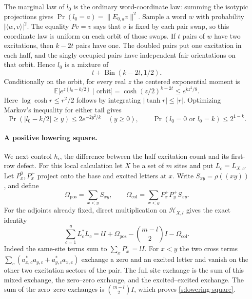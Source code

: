 The marginal law of \(l_0\) is the ordinary word-coordinate law:
summing the isotypic projections gives
\(\Pr(l_0=a)=\|E_{0,a}v\|^2\).  Sample a word \(w\) with probability
\(|\langle w,v\rangle|^2\).  The equality \(Pv=v\) says that \(v\) is
fixed by each pair swap, so this coordinate law is uniform on each
orbit of those swaps.  If \(t\) pairs of \(w\) have two excitations,
then \(k-2t\) pairs have one.  The doubled pairs put one excitation in
each half, and the singly occupied pairs have independent fair
orientations on that orbit.  Hence \(l_0\) is a mixture of
\[
 t+\operatorname{Bin}(k-2t,1/2).
\]
Conditionally on the orbit, for every real $z$ the centered exponential
moment is
\[
 \mathbb E\bigl[e^{z(l_0-k/2)}\mid\text{orbit}\bigr]
 =\cosh(z/2)^{k-2t}\le e^{kz^2/8}.
\]
Here $\log\cosh r\le r^2/2$ follows by integrating
$|\tanh r|\le|r|$.  Optimizing Markov's inequality for either tail gives
\begin{equation}\label{s:lowering-split-law}
 \Pr(|l_0-k/2|\ge y)\le2e^{-2y^2/k}\quad(y\ge0),
 \qquad
 \Pr(l_0=0\text{ or }l_0=k)\le2^{1-k}.
\end{equation}

\paragraph{A positive lowering square.}
We next control \(h_i\), the difference between the half excitation
count and its first-row defect.  For this local calculation let \(X\)
be a set of \(m\) sites and put \(L_c=L_{X,c}\).  Let \(P_x^0,P_x^+\) project onto the base and excited letters at \(x\).
Write \(S_{xy}=\rho((xy))\), and define
\[
 \Omega_{\mathrm{pos}}=\sum_{x<y}S_{xy},
 \qquad
 \Omega_{\mathrm{col}}=\sum_{x<y}P_x^+P_y^+S_{xy}.
\]
For the adjoints already fixed, direct multiplication on
\(\mathcal H_{X,l}\) gives the exact identity
\begin{equation}\label{s:lowering-square}
 \sum_{c=1}^q L_c^*L_c
 =lI+\Omega_{\mathrm{pos}}
       -\binom{m-l}{2}I-\Omega_{\mathrm{col}}.
\end{equation}
Indeed the same-site terms sum to \(\sum_xP_x^+=lI\).
For \(x<y\) the two cross terms
\(\sum_c(a_{x,c}^*a_{y,c}+a_{y,c}^*a_{x,c})\) exchange a zero and
an excited letter and vanish on the other two excitation sectors of
the pair.  The full site exchange is the sum of this mixed exchange,
the zero--zero exchange, and the excited--excited exchange.  The sum
of the zero--zero exchanges is \(\binom{m-l}{2}I\), which proves
\eqref{s:lowering-square}.


